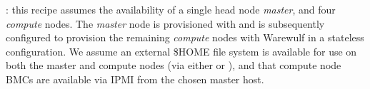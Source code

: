 : this recipe assumes the availability of a single head node
{\em master}, and four {\em compute} nodes. The {\em master} node is
provisioned with \baseOS{} and is subsequently configured to provision the
remaining {\em compute} nodes with Warewulf in a stateless configuration. We
assume an external \$HOME file system is available for use on both the master
and compute nodes (via either \NFS{} or \Lustre{}), and that compute node BMCs are
available via IPMI from the chosen master host.

